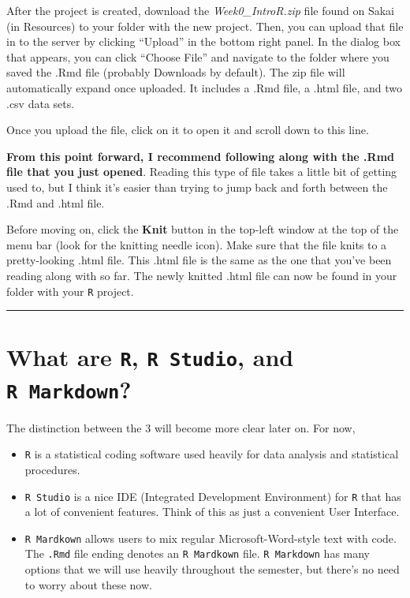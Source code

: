 \documentclass[
]{book}
\begin{document}
After the project is created, download the \emph{Week0\_IntroR.zip} file found on Sakai (in Resources) to your folder with the new project. Then, you can upload that file in to the server by clicking ``Upload'' in the bottom right panel. In the dialog box that appears, you can click ``Choose File'' and navigate to the folder where you saved the .Rmd file (probably Downloads by default). The zip file will automatically expand once uploaded. It includes a .Rmd file, a .html file, and two .csv data sets.

Once you upload the file, click on it to open it and scroll down to this line.

\textbf{From this point forward, I recommend following along with the .Rmd file that you just opened}. Reading this type of file takes a little bit of getting used to, but I think it's easier than trying to jump back and forth between the .Rmd and .html file.

Before moving on, click the \textbf{Knit} button in the top-left window at the top of the menu bar (look for the knitting needle icon). Make sure that the file knits to a pretty-looking .html file. This .html file is the same as the one that you've been reading along with so far. The newly knitted .html file can now be found in your folder with your \texttt{R} project.

\begin{center}\rule{0.5\linewidth}{0.5pt}\end{center}

\hypertarget{what-are-r-r-studio-and-r-markdown}{%
\section{\texorpdfstring{What are \texttt{R}, \texttt{R\ Studio}, and \texttt{R\ Markdown}?}{What are R, R Studio, and R Markdown?}}\label{what-are-r-r-studio-and-r-markdown}}

The distinction between the 3 will become more clear later on. For now,

\begin{itemize}
\item
  \texttt{R} is a statistical coding software used heavily for data analysis and statistical procedures.
\item
  \texttt{R\ Studio} is a nice IDE (Integrated Development Environment) for \texttt{R} that has a lot of convenient features. Think of this as just a convenient User Interface.
\item
  \texttt{R\ Mardkown} allows users to mix regular Microsoft-Word-style text with code. The \texttt{.Rmd} file ending denotes an \texttt{R\ Mardkown} file. \texttt{R\ Markdown} has many options that we will use heavily throughout the semester, but there's no need to worry about these now.
\end{itemize}
\end{document}
